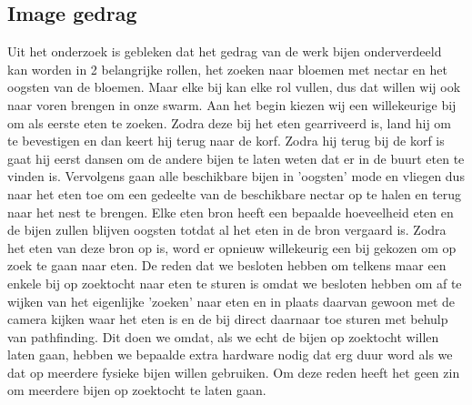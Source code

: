 \subsection{Image gedrag}
Uit het onderzoek is gebleken dat het gedrag van de werk bijen onderverdeeld kan worden in 2 belangrijke rollen, het zoeken naar bloemen met nectar en het oogsten van de bloemen. Maar elke bij kan elke rol vullen, dus dat willen wij ook naar voren brengen in onze swarm. Aan het begin kiezen wij een willekeurige bij om als eerste eten te zoeken. Zodra deze bij het eten gearriveerd is, land hij om te bevestigen en dan keert hij terug naar de korf. Zodra hij terug bij de korf is gaat hij eerst dansen om de andere bijen te laten weten dat er in de buurt eten te vinden is. Vervolgens gaan alle beschikbare bijen in 'oogsten' mode en vliegen dus naar het eten toe om een gedeelte van de beschikbare nectar op te halen en terug naar het nest te brengen. Elke eten bron heeft een bepaalde hoeveelheid eten en de bijen zullen blijven oogsten totdat al het eten in de bron vergaard is. Zodra het eten van deze bron op is, word er opnieuw willekeurig een bij gekozen om op zoek te gaan naar eten.
De reden dat we besloten hebben om telkens maar een enkele bij op zoektocht naar eten te sturen is omdat we besloten hebben om af te wijken van het eigenlijke 'zoeken' naar eten en in plaats daarvan gewoon met de camera kijken waar het eten is en de bij direct daarnaar toe sturen met behulp van pathfinding. Dit doen we omdat, als we echt de bijen op zoektocht willen laten gaan, hebben we bepaalde extra hardware nodig dat erg duur word als we dat op meerdere fysieke bijen willen gebruiken. Om deze reden heeft het geen zin om meerdere bijen op zoektocht te laten gaan.